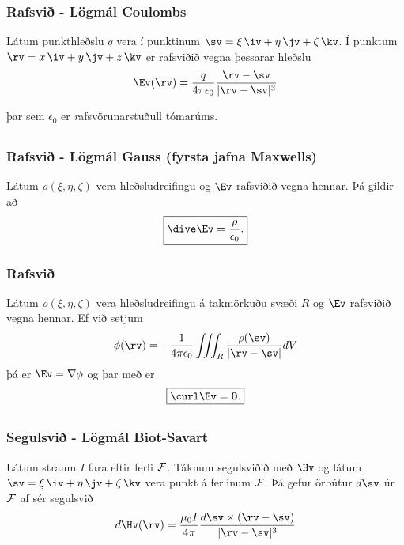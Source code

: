 \subsubsection{Rafsvið \rtask{} - Lögmál Coulombs }
 Látum punkthleðslu $q$ vera í punktinum $\sv=\xi\,\iv+\eta\,\jv+\zeta\,\kv$.   Í punktum $\rv=x\,\iv+y\,\jv+z\,\kv$ er rafsviðið vegna þessarar hleðslu
$$\Ev(\rv)=\frac{q}{4\pi\epsilon_0}\frac{\rv-\sv}{|\rv-\sv|^3}$$

þar sem $\epsilon_0$ er {\emph rafsvörunarstuðull} tómarúms.



\subsection{} 

\subsubsection{Rafsvið  \rtask{} - Lögmál Gauss (fyrsta jafna Maxwells)}
 Látum $\rho(\xi,\eta,\zeta)$ vera hleðsludreifingu og $\Ev$ rafsviðið vegna hennar.  Þá gildir að 
$$\boxed{\dive\Ev=\frac{\rho}{\epsilon_0}.}$$

\subsubsection{Rafsvið \rtask{}}
 Látum $\rho(\xi,\eta,\zeta)$ vera hleðsludreifingu á takmörkuðu svæði $R$ og $\Ev$ rafsviðið vegna hennar.  Ef við setjum
 $$ \phi(\rv) = -\frac{1}{4 \pi \epsilon_0} \iiint_R \frac{\rho(\sv)}{|\rv-\sv|} dV$$
 þá er $\Ev = \nabla \phi$ og þar með er 
$$\boxed{\curl \Ev= \mathbf{0}.}$$





\subsection{} 

\subsubsection{Segulsvið \rtask{} - Lögmál Biot-Savart }
 Látum straum $I$ fara eftir ferli $\cal F$.  Táknum segulsviðið með $\Hv$ og látum $\sv=\xi\,\iv+\eta\,\jv+\zeta\,\kv$ vera punkt á ferlinum $\cal F$.  Þá gefur örbútur $d\sv$ úr $\cal F$ af sér segulsvið 
$$d\Hv(\rv)=\frac{\mu_0 I}{4\pi}\frac{d\sv\times(\rv-\sv)}{|\rv-\sv|^3}$$

